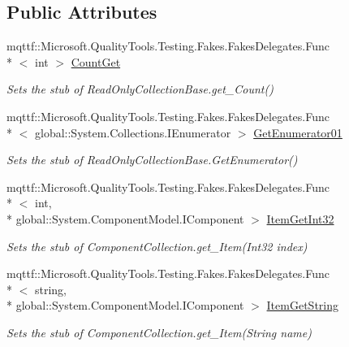 \subsection*{Public Attributes}
\begin{DoxyCompactItemize}
\item 
mqttf\-::\-Microsoft.\-Quality\-Tools.\-Testing.\-Fakes.\-Fakes\-Delegates.\-Func\\*
$<$ int $>$ \hyperlink{class_system_1_1_component_model_1_1_fakes_1_1_stub_component_collection_a85a94424acc6b775fbd9bd0404e5ce18}{Count\-Get}
\begin{DoxyCompactList}\small\item\em Sets the stub of Read\-Only\-Collection\-Base.\-get\-\_\-\-Count()\end{DoxyCompactList}\item 
mqttf\-::\-Microsoft.\-Quality\-Tools.\-Testing.\-Fakes.\-Fakes\-Delegates.\-Func\\*
$<$ global\-::\-System.\-Collections.\-I\-Enumerator $>$ \hyperlink{class_system_1_1_component_model_1_1_fakes_1_1_stub_component_collection_aa64378be301e53cefeb3ccfd28d0d9d4}{Get\-Enumerator01}
\begin{DoxyCompactList}\small\item\em Sets the stub of Read\-Only\-Collection\-Base.\-Get\-Enumerator()\end{DoxyCompactList}\item 
mqttf\-::\-Microsoft.\-Quality\-Tools.\-Testing.\-Fakes.\-Fakes\-Delegates.\-Func\\*
$<$ int, \\*
global\-::\-System.\-Component\-Model.\-I\-Component $>$ \hyperlink{class_system_1_1_component_model_1_1_fakes_1_1_stub_component_collection_a709941f3c931bb07818fb1594a381715}{Item\-Get\-Int32}
\begin{DoxyCompactList}\small\item\em Sets the stub of Component\-Collection.\-get\-\_\-\-Item(\-Int32 index)\end{DoxyCompactList}\item 
mqttf\-::\-Microsoft.\-Quality\-Tools.\-Testing.\-Fakes.\-Fakes\-Delegates.\-Func\\*
$<$ string, \\*
global\-::\-System.\-Component\-Model.\-I\-Component $>$ \hyperlink{class_system_1_1_component_model_1_1_fakes_1_1_stub_component_collection_a2b176a5c182bb91d345151ece567939a}{Item\-Get\-String}
\begin{DoxyCompactList}\small\item\em Sets the stub of Component\-Collection.\-get\-\_\-\-Item(\-String name)\end{DoxyCompactList}\end{DoxyCompactItemize}
